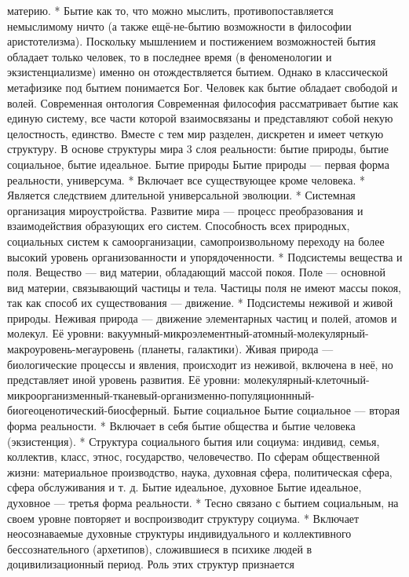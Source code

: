 \documentclass[12pt]{article}
\begin{document}
материю.
   * Бытие как то, что можно мыслить, противопоставляется немыслимому ничто (а также ещё-не-бытию
возможности  в  философии  аристотелизма).  Поскольку  мышлением  и  постижением  возможностей  бытия
обладает  только  человек,  то  в  последнее  время  (в  феноменологии  и  экзистенциализме)  именно  он
отождествляется бытием. Однако в классической метафизике под бытием понимается Бог. Человек как бытие
обладает свободой и волей.
Современная онтология
Современная  философия  рассматривает  бытие  как  единую  систему,  все  части  которой  взаимосвязаны  и
представляют собой некую целостность, единство. Вместе с тем мир разделен, дискретен и имеет четкую
структуру. В основе структуры мира 3 слоя реальности: бытие природы, бытие социальное, бытие идеальное.
Бытие природы
Бытие природы — первая форма реальности, универсума.
* Включает все существующее кроме человека.
* Является следствием длительной универсальной эволюции.
   * Системная организация мироустройства. Развитие мира — процесс преобразования и взаимодействия
образующих  его  систем.  Способность  всех  природных,  социальных  систем  к  самоорганизации,
самопроизвольному переходу на более высокий уровень организованности и упорядоченности.
* Подсистемы вещества и поля. Вещество — вид материи, обладающий массой покоя. Поле — основной вид
материи, связывающий частицы и тела. Частицы поля не имеют массы покоя, так как способ их существования
— движение.
   * Подсистемы неживой и живой природы. Неживая природа — движение элементарных частиц и полей,
атомов и молекул. Её уровни: вакуумный-микроэлементный-атомный-молекулярный-макроуровень-мегауровень
(планеты, галактики). Живая природа — биологические процессы и явления, происходит из неживой, включена
в неё, но представляет иной уровень развития. Её уровни: молекулярный-клеточный-микроорганизменный-тканевый-организменно-популяционнный-биогеоценотический-биосферный.
Бытие социальное
Бытие социальное — вторая форма реальности.
* Включает в себя бытие общества и бытие человека (экзистенция).
    *  Структура  социального  бытия  или  социума:  индивид,  семья,  коллектив,  класс,  этнос,  государство,
человечество.  По  сферам  общественной  жизни:  материальное  производство,  наука,  духовная  сфера,
политическая сфера, сфера обслуживания и т. д.
Бытие идеальное, духовное
Бытие идеальное, духовное — третья форма реальности.
* Тесно связано с бытием социальным, на своем уровне повторяет и воспроизводит структуру социума.
    *  Включает  неосознаваемые  духовные  структуры  индивидуального  и  коллективного  бессознательного
(архетипов),  сложившиеся  в  психике  людей  в  доцивилизационный  период.  Роль  этих  структур  признается
\end{document}
